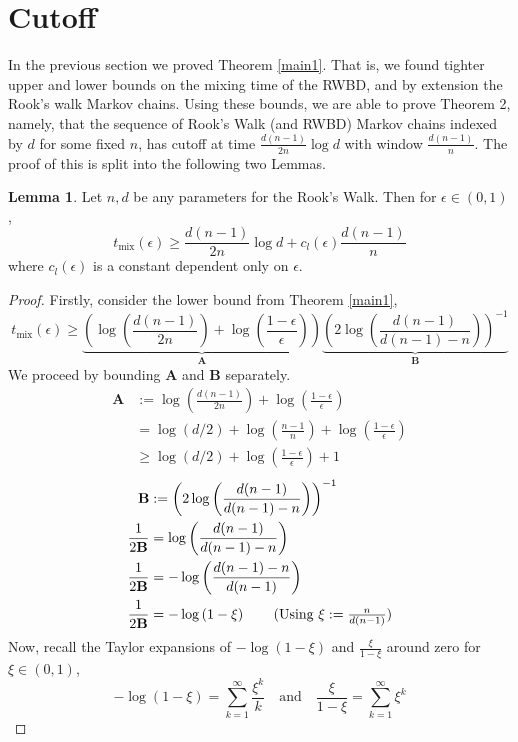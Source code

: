 \documentclass{article}
\theoremstyle{definition}
\theoremstyle{definition}
\theoremstyle{definition}
\newtheorem{lemma}{Lemma}
\theoremstyle{definition}
\theoremstyle{named}
\begin{document}
  \section{Cutoff}
  In the previous section we proved Theorem \ref{main1}. That is, we found tighter upper and lower bounds on the mixing time of the RWBD, and by extension the Rook's walk Markov chains. Using these bounds, we are able to prove Theorem 2, namely, that the sequence of Rook's Walk (and RWBD) Markov chains indexed by $d$ for some fixed $n$, has cutoff at time $\frac{d(n-1)}{2n}\log d$ with window $\frac{d(n-1)}{n}$. The proof of this is split into the following two Lemmas.
  \begin{lemma}
   Let $n,d$ be any parameters for the Rook's Walk. Then for $\epsilon\in(0,1)$,
   \[t_\text{mix}(\epsilon) \geq \frac{d(n-1)}{2n} \log d + c_l(\epsilon) \frac{d(n-1)}{n}\]
   where $c_l(\epsilon)$ is a constant dependent only on $\epsilon$.
   \begin{proof}
     Firstly, consider the lower bound from Theorem \ref{main1},
      \[t_\text{mix}(\epsilon) \geq \underbrace{\left(\log \left(\frac{d(n-1)}{2n}\right) + \log\left(\frac{1-\epsilon}{\epsilon}\right)\right)}_\mathbf{A} \underbrace{\left(2\log\left(\frac{d(n-1)}{d(n-1)-n}\right)\right)^{-1}}_\mathbf{B}\]
      We proceed by bounding $\mathbf{A}$ and $\mathbf{B}$ separately.
      \begin{align*}
         \mathbf{A} &:=  \log \left(\frac{d(n-1)}{2n}\right) + \log\left(\frac{1-\epsilon}{\epsilon}\right)\\
         &=  \log(d/2) + \log\left(\frac{n-1}{n}\right)+\log\left(\frac{1-\epsilon}{\epsilon}\right)\\
         &\geq  \log(d/2) + \log\left(\frac{1-\epsilon}{\epsilon}\right)+1
      \end{align*}
      \begin{align*}
         \mathbf{B} &:= \left(2\log\left(\frac{d(n-1)}{d(n-1)-n}\right)\right)^{-1}\\
         \frac{1}{2\mathbf{B}} &= \log\left(\frac{d(n-1)}{d(n-1)-n}\right)\\
         \frac{1}{2\mathbf{B}} &= -\log\left(\frac{d(n-1)-n}{d(n-1)}\right)\\
         \frac{1}{2\mathbf{B}} &= -\log\left(1 - \xi\right)\tag{Using $\xi:=\frac{n}{d(n-1)}$}
      \end{align*}
      Now, recall the Taylor expansions of $-\log(1-\xi)$ and $\frac{\xi}{1-\xi}$ around zero for $\xi\in (0,1)$,
      \[-\log(1-\xi) = \sum_{k=1}^\infty \frac{\xi^k}{k} \quad \text{and} \quad \frac{\xi}{1-\xi} = \sum_{k=1}^\infty \xi^k \]

\end{proof}
\end{lemma}
\end{document}
